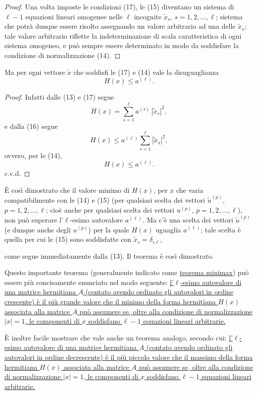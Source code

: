 \documentclass[11pt, a4paper]{book}
\numberwithin{equation}{section}
\begin{document}
\begin{proof}
Una volta imposte le condizioni (17), le (15) diventano un sistema di
$\ell-1$ equazioni lineari omogenee nelle $\ell$ incognite $\widetilde{x}_s$,
$s = 1, 2, \ldots, \ell$; sistema che potrà dunque essere risolto assegnando
un valore arbitrario ad una delle $\widetilde{x}_s$; tale valore arbitrario
riflette la indeterminazione di scala caratteristica di ogni sistema
omogeneo, e può sempre essere determinato in modo da soddisfare la
condizione di normalizzazione (14).
\end{proof}

Ma per ogni vettore $\widetilde{x}$ che soddisfi le (17) e (14) vale la
disuguaglianza
\begin{equation}
H(x) \leq a^{(\ell)}.
\end{equation}

\begin{proof}
Infatti dalle (13) e (17) segue
\[
H(x) = \sum_{s=1}^{\ell} a^{(s)}\,|\widetilde{x}_s|^2,
\]
e dalla (16) segue
\[
H(x) \leq a^{(\ell)} \sum_{s=1}^{\ell} |\widetilde{x}_s|^2,
\]
ovvero, per le (14),
\[
H(x) \leq a^{(\ell)}.
\]
c.v.d.
\end{proof}

È così dimostrato che il valore minimo di $H(x)$, per $x$ che varia
compatibilmente con le (14) e (15) (per qualsiasi scelta dei vettori
$\widetilde{u}^{(p)}$, $p = 1, 2, \ldots, \ell$; cioè anche per qualsiasi
scelta dei vettori $u^{(p)}$, $p=1,2,\ldots,\ell$), non può superare
l'$\ell$-esimo autovalore $a^{(\ell)}$. Ma c'è una scelta dei vettori
$\widetilde{u}^{(p)}$ (e dunque anche degli $u^{(p)}$) per la quale $H(x)$
uguaglia $a^{(\ell)}$; tale scelta è quella per cui le (15) sono soddisfatte
con $\widetilde{x}_s = \delta_{s\ell}$,


come segue immediatamente dalla (13). Il teorema è così dimostrato.

Questo importante teorema (generalmente indicato come \underline{teorema
minimax}) può essere più concisamente enunciato nel modo seguente:
\uline{l'$\ell$-esimo autovalore di una matrice hermitiana $A$ (contato
avendo ordinato gli autovalori in ordine crescente) è il più grande valore
che il minimo della forma hermitiana $H(x)$ associata alla matrice $A$ può
assumere se, oltre alla condizione di normalizzazione $|x| = 1$, le
componenti di $x$ soddisfano $\ell-1$ equazioni lineari arbitrarie.}

È inoltre facile mostrare che vale anche un teorema analogo, secondo cui:
\uline{l'$\ell$-esimo autovalore di una matrice hermitiana $A$ (contato
avendo ordinato gli autovalori in ordine decrescente) è il più piccolo
valore che il massimo della forma hermitiana $H(x)$ associata alla matrice
$A$ può assumere se, oltre alla condizione di normalizzazione $|x| = 1$,
le componenti di $x$ soddisfano $\ell-1$ equazioni lineari arbitrarie.}
\end{document}
